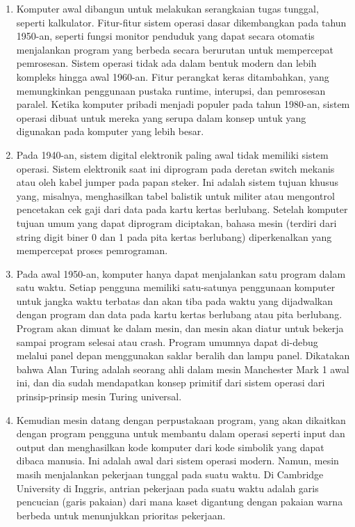 	\begin{enumerate}
		\item Komputer awal dibangun untuk melakukan serangkaian tugas tunggal, seperti kalkulator. Fitur-fitur sistem operasi dasar dikembangkan pada tahun 1950-an, seperti fungsi monitor penduduk yang dapat secara otomatis menjalankan program yang berbeda secara berurutan untuk mempercepat pemrosesan. Sistem operasi tidak ada dalam bentuk modern dan lebih kompleks hingga awal 1960-an. Fitur perangkat keras ditambahkan, yang memungkinkan penggunaan pustaka runtime, interupsi, dan pemrosesan paralel. Ketika komputer pribadi menjadi populer pada tahun 1980-an, sistem operasi dibuat untuk mereka yang serupa dalam konsep untuk yang digunakan pada komputer yang lebih besar.
		\item Pada 1940-an, sistem digital elektronik paling awal tidak memiliki sistem operasi. Sistem elektronik saat ini diprogram pada deretan switch mekanis atau oleh kabel jumper pada papan steker. Ini adalah sistem tujuan khusus yang, misalnya, menghasilkan tabel balistik untuk militer atau mengontrol pencetakan cek gaji dari data pada kartu kertas berlubang. Setelah komputer tujuan umum yang dapat diprogram diciptakan, bahasa mesin (terdiri dari string digit biner 0 dan 1 pada pita kertas berlubang) diperkenalkan yang mempercepat proses pemrograman.
		\item Pada awal 1950-an, komputer hanya dapat menjalankan satu program dalam satu waktu. Setiap pengguna memiliki satu-satunya penggunaan komputer untuk jangka waktu terbatas dan akan tiba pada waktu yang dijadwalkan dengan program dan data pada kartu kertas berlubang atau pita berlubang. Program akan dimuat ke dalam mesin, dan mesin akan diatur untuk bekerja sampai program selesai atau crash. Program umumnya dapat di-debug melalui panel depan menggunakan saklar beralih dan lampu panel. Dikatakan bahwa Alan Turing adalah seorang ahli dalam mesin Manchester Mark 1 awal ini, dan dia sudah mendapatkan konsep primitif dari sistem operasi dari prinsip-prinsip mesin Turing universal.
		\item Kemudian mesin datang dengan perpustakaan program, yang akan dikaitkan dengan program pengguna untuk membantu dalam operasi seperti input dan output dan menghasilkan kode komputer dari kode simbolik yang dapat dibaca manusia. Ini adalah awal dari sistem operasi modern. Namun, mesin masih menjalankan pekerjaan tunggal pada suatu waktu. Di Cambridge University di Inggris, antrian pekerjaan pada suatu waktu adalah garis pencucian (garis pakaian) dari mana kaset digantung dengan pakaian warna berbeda untuk menunjukkan prioritas pekerjaan.


\end{enumerate}
